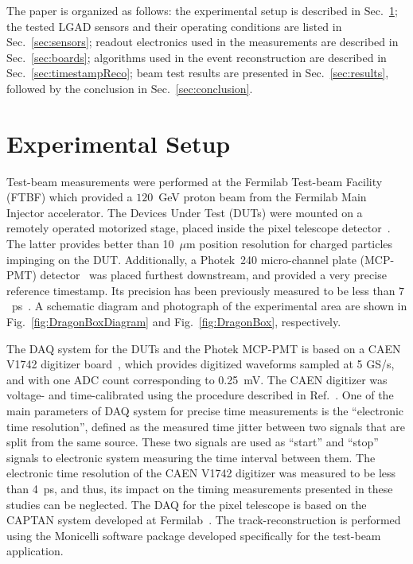 \documentclass[preprint,1p]{elsarticle}
\begin{document}
The paper is organized as follows: the experimental setup is described in
Sec.~\ref{sec:setup}; the tested LGAD sensors and their operating conditions are
listed in Sec.~\ref{sec:sensors}; readout electronics used in the measurements
are described in Sec.~\ref{sec:boards}; algorithms used in the event
reconstruction are described in Sec.~\ref{sec:timestampReco}; beam test results
are presented in Sec.~\ref{sec:results}, followed by the conclusion in
Sec.~\ref{sec:conclusion}.

\section{Experimental Setup} 
\label{sec:setup}


Test-beam measurements were performed at the Fermilab Test-beam Facility (FTBF)
which provided a $120$~GeV proton beam from the Fermilab Main Injector
accelerator. The Devices Under Test (DUTs) were mounted on a remotely operated
motorized stage, placed inside the pixel telescope detector~\cite{KWAN2016162}.
The latter provides better than 10~$\mu$m position resolution for charged
particles impinging on the DUT. Additionally, a Photek~240 micro-channel plate
(MCP-PMT) detector~\cite{Anderson:2015gha, MCPFastCaloNIMA,
Ronzhin2015288,Ronzhin201552} was placed furthest downstream, and provided a
very precise reference timestamp. Its precision has been previously
measured to be less than $7$~ps~\cite{Ronzhin2015288}. A schematic diagram and
photograph of the experimental area are shown in Fig.~\ref{fig:DragonBoxDiagram}
and Fig.~\ref{fig:DragonBox}, respectively. 

The DAQ system for the DUTs and the Photek MCP-PMT is based on a CAEN V1742
digitizer board~\cite{CAENDRS}, which provides digitized waveforms sampled at 5
GS/s, and with one ADC count corresponding to 0.25~mV. The CAEN digitizer was
voltage- and time-calibrated using the procedure described in
Ref.~\cite{Kim201467}. One of the main parameters of DAQ system for precise time
measurements is the ``electronic time resolution'', defined as the measured time
jitter between two signals that are split from the same source. These two
signals are used as ``start'' and ``stop'' signals to electronic system
measuring the time interval between them. The electronic time resolution of the
CAEN V1742 digitizer was measured to be less than 4~ps, and thus, its impact on
the timing measurements presented in these studies can be neglected. The DAQ for
the pixel telescope is based on the CAPTAN system developed at
Fermilab~\cite{KWAN2016162}. The track-reconstruction is performed using the
Monicelli software package developed specifically for the test-beam application. 
\end{document}
